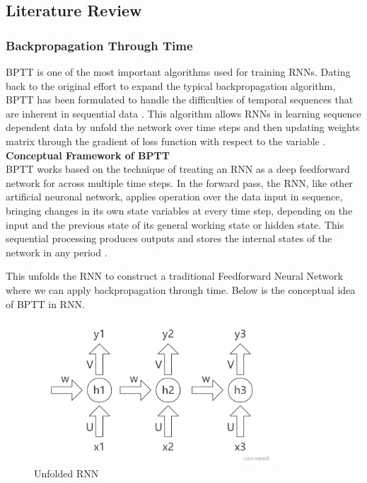 \documentclass[12pt,a4paper]{article}
\begin{document}
\subsection{Literature Review}
\subsubsection{Backpropagation Through Time}
BPTT is one of the most important algorithms used for training RNNs. Dating back to the original effort to expand the typical backpropagation algorithm, BPTT has been formulated to handle the difficulties of temporal sequences that are inherent in sequential data \parencite{werbos1990bptt}. This algorithm allows RNNs in learning sequence dependent data by unfold the network over time steps and then updating weights matrix through the gradient of loss function with respect to the variable \parencite{rumelhart1986backpropagation}.
\\[2ex]
\textbf{Conceptual Framework of BPTT}
\\[1ex]
BPTT works based on the technique of treating an RNN as a deep feedforward network for across multiple time steps. In the forward pass, the RNN, like other artificial neuronal network, applies operation over the data input in sequence, bringing changes in its own state variables at every time step, depending on the input and the previous state of its general working state or hidden state. This sequential processing produces outputs and stores the internal states of the network in any period \parencite{werbos1990bptt}.

This unfolds the RNN to construct a traditional Feedforward Neural Network where we can apply backpropagation through time. Below is the conceptual idea of BPTT in RNN.
\newpage
\begin{figure}[h!]
    \centering
    \includegraphics[width=0.8\textwidth]{../Pic/pic1.png} %
    \caption{Unfolded RNN}
\end{figure}
\end{document}
